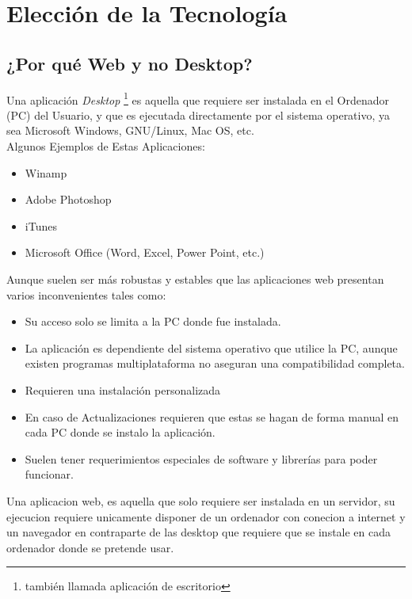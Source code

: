 ﻿\chapter{Elección de la Tecnología}

\section{¿Por qué Web y no Desktop?}

Una aplicación \textit{Desktop} \footnote{también llamada aplicación de escritorio} es aquella que requiere ser instalada en el Ordenador (PC) del Usuario, y que es ejecutada directamente por el sistema operativo, ya sea Microsoft Windows, GNU/Linux, Mac OS, etc.\\[0.1cm]

Algunos Ejemplos de Estas Aplicaciones:

\begin{itemize}
    \item Winamp
    \item Adobe Photoshop
    \item iTunes
    \item Microsoft Office (Word, Excel, Power Point, etc.)
\end{itemize}

Aunque suelen ser más robustas y estables que las aplicaciones web presentan varios inconvenientes tales como:

\begin{itemize}
    \item Su acceso solo se limita a la PC donde fue instalada.
    \item La aplicación es dependiente del sistema operativo que utilice la PC, aunque existen programas multiplataforma no aseguran una compatibilidad completa.
    \item Requieren una instalación personalizada
    \item En caso de Actualizaciones requieren que estas se hagan de forma manual en cada PC  donde se instalo la aplicación.
    \item Suelen tener requerimientos especiales de software y librerías para poder funcionar.
\end{itemize}


Una aplicacion web, es aquella que solo requiere ser instalada en un servidor, su ejecucion requiere unicamente disponer de un ordenador con conecion a internet y un navegador en contraparte de las desktop que requiere que se instale en cada ordenador donde se pretende usar. \\[0.1cm]


